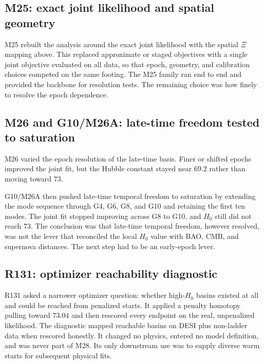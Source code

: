 \subsection{M25: exact joint likelihood and spatial geometry}
\label{app:history-m25}

M25 rebuilt the analysis around the exact joint likelihood with the
spatial $\Xi$ mapping above. This replaced approximate or staged
objectives with a single joint objective evaluated on all data, so that
epoch, geometry, and calibration choices competed on the same footing.
The M25 family ran end to end and provided the backbone for resolution
tests. The remaining choice was how finely to resolve the epoch
dependence.

\subsection{M26 and G10/M26A: late-time freedom tested to saturation}
\label{app:history-m26-g10}

M26 varied the epoch resolution of the late-time basis. Finer or
shifted epochs improved the joint fit, but the Hubble constant stayed
near $69.2$ rather than moving toward $73$.

G10/M26A then pushed late-time temporal freedom to saturation by
extending the mode sequence through G4, G6, G8, and G10 and retaining
the first ten modes. The joint fit stopped improving across G8 to G10,
and $H_{0}$ still did not reach $73$. The conclusion was that late-time
temporal freedom, however resolved, was not the lever that reconciled
the local $H_{0}$ value with BAO, CMB, and supernova distances. The next
step had to be an early-epoch lever.

\subsection{R131: optimizer reachability diagnostic}
\label{app:history-r131}

R131 asked a narrower optimizer question: whether high-$H_{0}$ basins
existed at all and could be reached from penalized starts. It applied a
penalty homotopy pulling toward $73.04$ and then rescored every endpoint
on the real, unpenalized likelihood. The diagnostic mapped reachable
basins on DESI plus non-ladder data when rescored honestly. It changed
no physics, entered no model definition, and was never part of M28. Its
only downstream use was to supply diverse warm starts for subsequent
physical fits.

